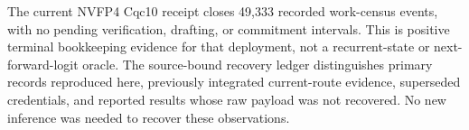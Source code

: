 The current NVFP4 Cqc10 receipt closes 49,333 recorded work-census events, with no pending verification, drafting, or commitment intervals. This is positive terminal bookkeeping evidence for that deployment, not a recurrent-state or next-forward-logit oracle. The source-bound recovery ledger distinguishes primary records reproduced here, previously integrated current-route evidence, superseded credentials, and reported results whose raw payload was not recovered. No new inference was needed to recover these observations.
